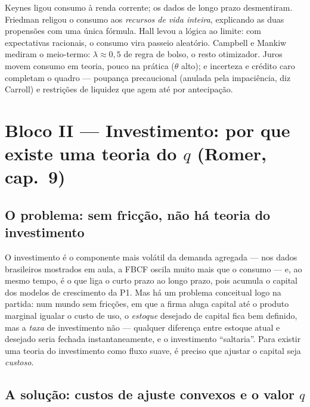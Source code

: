 \documentclass[12pt, a4paper]{article}
\begin{document}
\begin{sintesebox}[title={Síntese do Bloco I --- a história em cinco frases}]
Keynes ligou consumo à renda corrente; os dados de longo prazo desmentiram.
Friedman religou o consumo aos \emph{recursos de vida inteira}, explicando as
duas propensões com uma única fórmula. Hall levou a lógica ao limite: com
expectativas racionais, o consumo vira passeio aleatório. Campbell e Mankiw
mediram o meio-termo: $\lambda \approx 0{,}5$ de regra de bolso, o resto
otimizador. Juros movem consumo em teoria, pouco na prática ($\theta$ alto);
e incerteza e crédito caro completam o quadro --- poupança precaucional
(anulada pela impaciência, diz Carroll) e restrições de liquidez que agem até
por antecipação.
\end{sintesebox}

\section{Bloco II --- Investimento: por que existe uma teoria do $q$ (Romer, cap.\ 9)}

\subsection{O problema: sem fricção, não há teoria do investimento}

O investimento é o componente mais volátil da demanda agregada --- nos dados
brasileiros mostrados em aula, a FBCF oscila muito mais que o consumo --- e,
ao mesmo tempo, é o que liga o curto prazo ao longo prazo, pois acumula o
capital dos modelos de crescimento da P1. Mas há um problema conceitual logo
na partida: num mundo sem fricções, em que a firma aluga capital até o produto
marginal igualar o custo de uso, o \emph{estoque} desejado de capital fica
bem definido, mas a \emph{taxa} de investimento não --- qualquer diferença
entre estoque atual e desejado seria fechada instantaneamente, e o
investimento ``saltaria''. Para existir uma teoria do investimento como fluxo
suave, é preciso que ajustar o capital seja \emph{custoso}.

\subsection{A solução: custos de ajuste convexos e o valor $q$}
\end{document}
